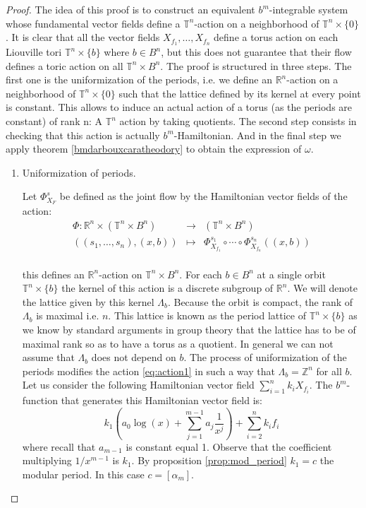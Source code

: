 \begin{proof}
The idea of this proof is to construct an equivalent $b^m$-integrable system whose fundamental vector fields define a $\mathbb{T}^n$-action on a neighborhood of $\mathbb{T}^n\times\{0\}$.
It is clear that all the vector fields $X_{f_1},\ldots,X_{f_n}$ define a torus action on each Liouville tori $\mathbb{T}^n\times\{b\}$ where $b\in B^n$, but this does not guarantee that their flow defines a toric action on all $\mathbb{T}^n\times B^n$.
The proof is structured in three steps. The first one is the uniformization of the periods, i.e. we define an $\mathbb{R}^n$-action on a neighborhood of $\mathbb{T}^n\times\{0\}$ such that the lattice defined by its kernel at every point is constant. This allows to induce an actual action of a torus (as the periods are constant) of rank n: A $\mathbb T^n$ action by taking quotients. The second step consists in checking that this action is actually $b^m$-Hamiltonian. And in the final step we apply theorem \ref{bmdarbouxcaratheodory} to obtain the expression of $\omega$.
\begin{enumerate}

\item Uniformization of periods.

Let $\Phi_{X_F}^s$ be defined as the joint flow by the Hamiltonian vector fields of the action:
\begin{equation}\label{eq:action1}
\begin{array}{rcl}
 \Phi: \mathbb{R}^n\times(\mathbb{T}^n\times B^n)& \rightarrow & (\mathbb{T}^n\times B^n)\\
 ((s_1,\ldots,s_n),(x,b)) & \mapsto & \Phi_{X_{f_1}}^{s_1}\circ\cdots\circ\Phi_{X_{f_n}}^{s_n}((x,b))\\

\end{array}
\end{equation}

this defines an $\mathbb{R}^n$-action on $\mathbb{T}^n\times B^n$.
For each $b\in B^n$ at a single orbit $\mathbb{T}^n\times\{b\}$ the kernel of this action is a discrete subgroup of $\mathbb{R}^n$. We will denote the lattice given by this kernel $\Lambda_b$. Because the orbit is compact, the rank of $\Lambda_b$ is maximal i.e. $n$. This lattice is known as the period lattice of $\mathbb{T}^n\times\{b\}$ as we know by standard arguments in group theory that the lattice has to be of maximal rank so as to have a torus as a quotient.
In general we can not assume that $\Lambda_b$ does not depend on $b$. The process of uniformization of the periods modifies the action \ref{eq:action1} in such a way that $\Lambda_b = \mathbb{Z}^n$ for all $b$.
Let us consider the following Hamiltonian vector field $\sum_{i=1}^n k_iX_{f_i}$. The $b^m$-function that generates this Hamiltonian vector field is:
$$k_1\left(a_0\log(x) + \sum_{j=1}^{m-1}a_j\frac{1}{x^j}\right) + \sum_{i=2}^n k_i f_i$$
where recall that $a_{m-1}$ is constant equal 1. Observe that the coefficient multiplying $1/x^{m-1}$ is $k_1$. By proposition \ref{prop:mod_period} $k_1 = c$ the modular period. In this case $c = [\alpha_m]$.


\end{enumerate}
\end{proof}
